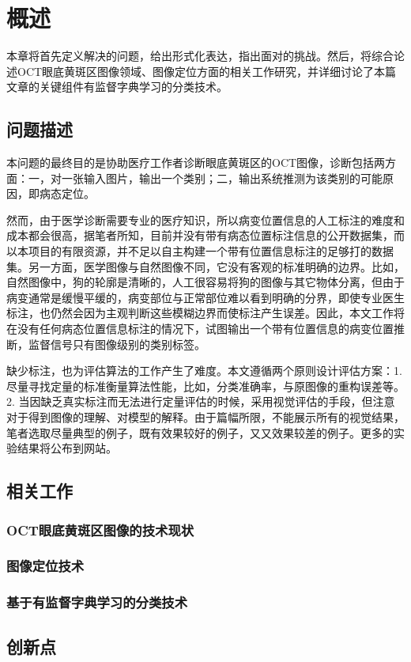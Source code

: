 \chapter{概述}
    本章将首先定义解决的问题，给出形式化表达，指出面对的挑战。然后，将综合论述OCT眼底黄斑区图像领域、图像定位方面的相关工作研究，并详细讨论了本篇文章的关键组件有监督字典学习的分类技术。

\section{问题描述}
    本问题的最终目的是协助医疗工作者诊断眼底黄斑区的OCT图像，诊断包括两方面：一，对一张输入图片，输出一个类别；二，输出系统推测为该类别的可能原因，即病态定位。

    然而，由于医学诊断需要专业的医疗知识，所以病变位置信息的人工标注的难度和成本都会很高，据笔者所知，目前并没有带有病态位置标注信息的公开数据集，而以本项目的有限资源，并不足以自主构建一个带有位置信息标注的足够打的数据集。另一方面，医学图像与自然图像不同，它没有客观的标准明确的边界。比如，自然图像中，狗的轮廓是清晰的，人工很容易将狗的图像与其它物体分离，但由于病变通常是缓慢平缓的，病变部位与正常部位难以看到明确的分界，即使专业医生标注，也仍然会因为主观判断这些模糊边界而使标注产生误差。因此，本文工作将在没有任何病态位置信息标注的情况下，试图输出一个带有位置信息的病变位置推断，监督信号只有图像级别的类别标签。

    缺少标注，也为评估算法的工作产生了难度。本文遵循两个原则设计评估方案：1. 尽量寻找定量的标准衡量算法性能，比如，分类准确率，与原图像的重构误差等。2. 当因缺乏真实标注而无法进行定量评估的时候，采用视觉评估的手段，但注意对于得到图像的理解、对模型的解释。由于篇幅所限，不能展示所有的视觉结果，笔者选取尽量典型的例子，既有效果较好的例子，又又效果较差的例子。更多的实验结果将公布到网站。




\section{相关工作}

    \subsection{OCT眼底黄斑区图像的技术现状}
    \subsection{图像定位技术}
    \subsection{基于有监督字典学习的分类技术}

\section{创新点}